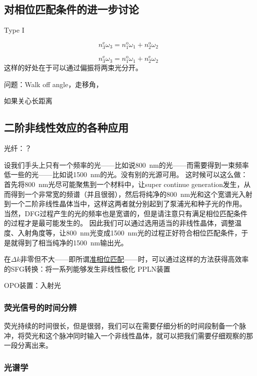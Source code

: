 \documentclass[UTF8, a4paper]{ctexart}
\newcommand{\concept}[1]{\underline{#1}}
\begin{document}
\subsection{对相位匹配条件的进一步讨论}

Type I

\begin{equation}
    n^\text{e}_3 \omega_3 = n^\text{o}_1 \omega_1 + n^\text{o}_2 \omega_2
\end{equation}

\begin{equation}
    n^\text{e}_3 \omega_3 = n^\text{o}_1 \omega_1 + n^\text{e}_2 \omega_2
\end{equation}
这样的好处在于可以通过偏振将两束光分开。

问题：Walk off angle，走移角，

如果关心长距离

\subsection{二阶非线性效应的各种应用}

光纤：？

设我们手头上只有一个频率的光——比如说\SI{800}{nm}的光——而需要得到一束频率低一些的光——比如说\SI{1500}{nm}的光。没有别的光源可用。
这时候可以这么做：首先将\SI{800}{nm}光尽可能聚焦到一个材料中，让super continue generation发生，从而得到一个非常宽的频谱（并且很弱），然后将纯净的\SI{800}{nm}光和这个宽谱光入射到一个二阶非线性晶体当中，这样这两者就分别起到了泵浦光和种子光的作用。
当然，DFG过程产生的光的频率也是宽谱的，但是请注意只有满足相位匹配条件的过程才是最可能发生的。
因此我们可以通过选用适当的非线性晶体，调整温度、入射角度等，让\SI{800}{nm}光变成\SI{1500}{nm}光的过程正好符合相位匹配条件，于是就得到了相当纯净的\SI{1500}{nm}输出光。

在$\Delta k$非零但不大——即所谓\concept{准相位匹配}——时，可以通过这样的方法获得高效率的SFG转换：将一系列能够发生非线性极化
PPLN装置

OPO装置：入射光

\subsubsection{荧光信号的时间分辨}

荧光持续的时间很长，但是很弱，我们可以在需要仔细分析的时间段制备一个脉冲，将荧光和这个脉冲同时输入一个非线性晶体，就可以把我们需要仔细观察的那一段分离出来。

\subsubsection{光谱学}
\end{document}
